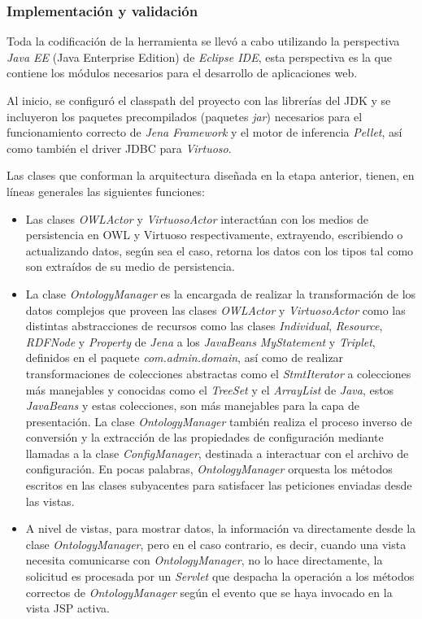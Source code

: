 \begin{itemize}
\subsubsection{Implementación y validación}
Toda la codificación de la herramienta se llevó a cabo utilizando la perspectiva \textit{Java EE} (Java Enterprise Edition) de \textit{Eclipse IDE}, esta perspectiva es la que contiene los módulos necesarios para el desarrollo de aplicaciones web.

Al inicio, se configuró el classpath del proyecto con las librerías del JDK y se incluyeron los paquetes precompilados (paquetes \textit{jar}) necesarios para el funcionamiento correcto de \textit{Jena Framework} y el motor de inferencia \textit{Pellet}, así como también el driver JDBC para \textit{Virtuoso}. 

Las clases que conforman la arquitectura diseñada en la etapa anterior, tienen, en líneas generales las siguientes funciones:

\begin{itemize}
    \item Las clases \textit{OWLActor} y \textit{VirtuosoActor} interactúan con los medios de persistencia en OWL y Virtuoso respectivamente, extrayendo, escribiendo o actualizando datos, según sea el caso, retorna los datos con los tipos tal como son extraídos de su medio de persistencia.
    \item La clase \textit{OntologyManager} es la encargada de realizar la transformación de los datos complejos que proveen las clases \textit{OWLActor} y \textit{VirtuosoActor} como las distintas abstracciones de recursos como las clases \textit{Individual}, \textit{Resource}, \textit{RDFNode} y \textit{Property} de \textit{Jena} a los \textit{JavaBeans} \textit{MyStatement} y \textit{Triplet}, definidos en el paquete \textit{com.admin.domain}, así como de realizar transformaciones de colecciones abstractas como el \textit{StmtIterator} a colecciones más manejables y conocidas como el \textit{TreeSet} y el \textit{ArrayList} de \textit{Java}, estos \textit{JavaBeans} y estas colecciones, son más manejables para la capa de presentación. La clase \textit{OntologyManager} también realiza el proceso inverso de conversión y la extracción de las propiedades de configuración mediante llamadas a la clase \textit{ConfigManager}, destinada a interactuar con el archivo de configuración. En pocas palabras, \textit{OntologyManager} orquesta los métodos escritos en las clases subyacentes para satisfacer las peticiones enviadas desde las vistas.
    \item A nivel de vistas, para mostrar datos, la información va directamente desde la clase \textit{OntologyManager}, pero en el caso contrario, es decir, cuando una vista necesita comunicarse con \textit{OntologyManager}, no lo hace directamente, la solicitud es procesada por un \textit{Servlet} que despacha la operación a los métodos correctos de \textit{OntologyManager} según el evento que se haya invocado en la vista JSP activa.


\end{itemize}
\end{itemize}

